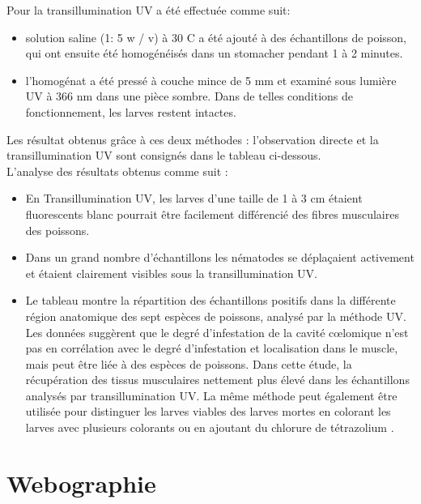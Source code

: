 \documentclass[12pt,a4paper]{article}
\begin{document}
Pour la transillumination UV a été effectuée comme suit: 
\begin{itemize}
\item   solution saline (1: 5 w / v) à 30 \degree C a été ajouté à des échantillons de poisson, qui ont ensuite été homogénéisés dans un stomacher pendant 1 à 2 minutes.
\item l'homogénat a été pressé à couche mince de 5 mm et examiné sous lumière UV à 366 nm dans une pièce sombre. Dans de telles conditions de fonctionnement, les larves restent intactes.
\end{itemize} 
Les résultat obtenus grâce à ces deux méthodes : l’observation directe et la transillumination UV sont consignés dans le tableau ci-dessous.\\  
L'analyse des résultats obtenus comme suit :
\begin{itemize}
\item En Transillumination UV, les larves d'une taille de 1 à 3 cm étaient fluorescents blanc pourrait être facilement différencié des fibres musculaires des poissons.
\item  	Dans un grand nombre d'échantillons les nématodes se déplaçaient activement et étaient clairement visibles sous la transillumination UV.
 \item	Le tableau montre la répartition des échantillons positifs dans la différente région anatomique des sept espèces de poissons, analysé par la méthode UV. Les données suggèrent que le degré d'infestation de la cavité cœlomique n'est pas en corrélation avec le degré d'infestation et localisation dans le muscle, mais peut être liée à des espèces de poissons. Dans cette étude, la récupération des tissus musculaires nettement plus élevé dans les échantillons analysés par transillumination UV. La même méthode peut également être utilisée pour distinguer les larves viables des larves mortes en colorant les larves avec plusieurs colorants ou en ajoutant du chlorure de tétrazolium . 
\end{itemize} 
\newpage


\newpage
\section*{Webographie}
\end{document}
